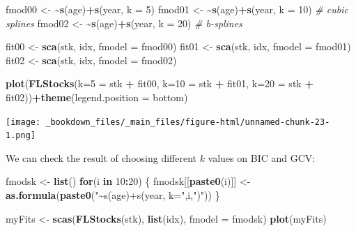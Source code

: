 \documentclass[
]{book}
\newenvironment{Shaded}{\begin{snugshade}}{\end{snugshade}}
\newcommand{\AttributeTok}[1]{\textcolor[rgb]{0.13,0.29,0.53}{#1}}
\newcommand{\CommentTok}[1]{\textcolor[rgb]{0.56,0.35,0.01}{\textit{#1}}}
\newcommand{\ControlFlowTok}[1]{\textcolor[rgb]{0.13,0.29,0.53}{\textbf{#1}}}
\newcommand{\DecValTok}[1]{\textcolor[rgb]{0.00,0.00,0.81}{#1}}
\newcommand{\ErrorTok}[1]{\textcolor[rgb]{0.64,0.00,0.00}{\textbf{#1}}}
\newcommand{\FunctionTok}[1]{\textcolor[rgb]{0.13,0.29,0.53}{\textbf{#1}}}
\newcommand{\NormalTok}[1]{#1}
\newcommand{\OtherTok}[1]{\textcolor[rgb]{0.56,0.35,0.01}{#1}}
\newcommand{\SpecialCharTok}[1]{\textcolor[rgb]{0.81,0.36,0.00}{\textbf{#1}}}
\newcommand{\StringTok}[1]{\textcolor[rgb]{0.31,0.60,0.02}{#1}}
\begin{document}
\begin{Shaded}
\begin{Highlighting}[]
\NormalTok{fmod00 }\OtherTok{\textless{}{-}} \ErrorTok{\textasciitilde{}}\FunctionTok{s}\NormalTok{(age)}\SpecialCharTok{+}\FunctionTok{s}\NormalTok{(year, }\AttributeTok{k =} \DecValTok{5}\NormalTok{) }
\NormalTok{fmod01 }\OtherTok{\textless{}{-}} \ErrorTok{\textasciitilde{}}\FunctionTok{s}\NormalTok{(age)}\SpecialCharTok{+}\FunctionTok{s}\NormalTok{(year, }\AttributeTok{k =} \DecValTok{10}\NormalTok{) }\CommentTok{\# cubic splines}
\NormalTok{fmod02 }\OtherTok{\textless{}{-}} \ErrorTok{\textasciitilde{}}\FunctionTok{s}\NormalTok{(age)}\SpecialCharTok{+}\FunctionTok{s}\NormalTok{(year, }\AttributeTok{k =} \DecValTok{20}\NormalTok{) }\CommentTok{\# b{-}splines}

\NormalTok{fit00 }\OtherTok{\textless{}{-}} \FunctionTok{sca}\NormalTok{(stk, idx, }\AttributeTok{fmodel =}\NormalTok{ fmod00)}
\NormalTok{fit01 }\OtherTok{\textless{}{-}} \FunctionTok{sca}\NormalTok{(stk, idx, }\AttributeTok{fmodel =}\NormalTok{ fmod01)}
\NormalTok{fit02 }\OtherTok{\textless{}{-}} \FunctionTok{sca}\NormalTok{(stk, idx, }\AttributeTok{fmodel =}\NormalTok{ fmod02)}

\FunctionTok{plot}\NormalTok{(}\FunctionTok{FLStocks}\NormalTok{(}\StringTok{\textquotesingle{}k=5\textquotesingle{}} \OtherTok{=}\NormalTok{ stk }\SpecialCharTok{+}\NormalTok{ fit00,}
              \StringTok{\textquotesingle{}k=10\textquotesingle{}} \OtherTok{=}\NormalTok{ stk }\SpecialCharTok{+}\NormalTok{ fit01,}
              \StringTok{\textquotesingle{}k=20\textquotesingle{}} \OtherTok{=}\NormalTok{ stk }\SpecialCharTok{+}\NormalTok{ fit02))}\SpecialCharTok{+}\FunctionTok{theme}\NormalTok{(}\AttributeTok{legend.position =} \StringTok{\textquotesingle{}bottom\textquotesingle{}}\NormalTok{)}
\end{Highlighting}
\end{Shaded}

\texttt{[image: \_bookdown\_files/\_main\_files/figure-html/unnamed-chunk-23-1.png]}

We can check the result of choosing different \(k\) values on BIC and GCV:

\begin{Shaded}
\begin{Highlighting}[]
\NormalTok{fmodsk }\OtherTok{\textless{}{-}} \FunctionTok{list}\NormalTok{()}
\ControlFlowTok{for}\NormalTok{(i }\ControlFlowTok{in} \DecValTok{10}\SpecialCharTok{:}\DecValTok{20}\NormalTok{) \{}
\NormalTok{  fmodsk[[}\FunctionTok{paste0}\NormalTok{(i)]] }\OtherTok{\textless{}{-}} \FunctionTok{as.formula}\NormalTok{(}\FunctionTok{paste0}\NormalTok{(}\StringTok{"\textasciitilde{}s(age)+s(year, k="}\NormalTok{,i,}\StringTok{")"}\NormalTok{))}
\NormalTok{\}}

\NormalTok{myFits }\OtherTok{\textless{}{-}} \FunctionTok{scas}\NormalTok{(}\FunctionTok{FLStocks}\NormalTok{(stk), }\FunctionTok{list}\NormalTok{(idx), }\AttributeTok{fmodel =}\NormalTok{ fmodsk)}
\FunctionTok{plot}\NormalTok{(myFits)}
\end{Highlighting}
\end{Shaded}
\end{document}
